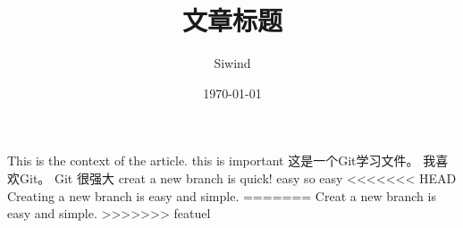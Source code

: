 \documentclass[UTF8]{ctexart}
\title{文章标题}
\author{Siwind}
\date{\today}
\begin{document}
    \maketitle
    This is the context of the article.
    this is important
    这是一个Git学习文件。
    我喜欢Git。
    Git 很强大
    creat a new branch is quick!
    easy
    so easy
<<<<<<< HEAD
    Creating a new branch is easy and simple.
=======
    Creat a new branch is easy and simple.
>>>>>>> featuel
    
\end{document}
